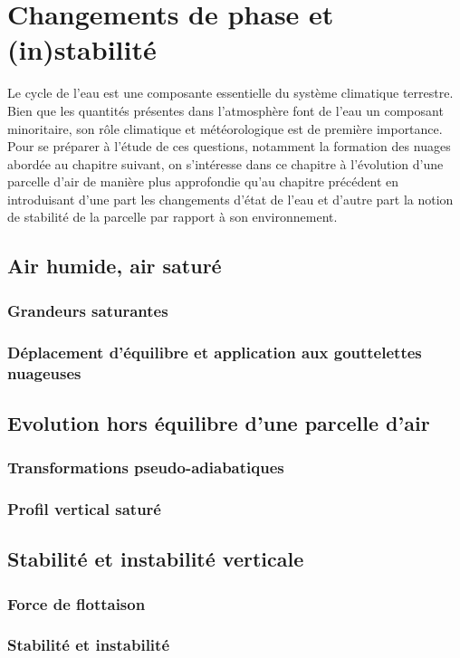 \chapter{Changements de phase et (in)stabilité}


\bk
Le cycle de l'eau est une composante essentielle du système climatique terrestre. Bien que les quantités présentes dans l'atmosphère font de l'eau un composant minoritaire, son rôle climatique et météorologique est de première importance. Pour se préparer à l'étude de ces questions, notamment la formation des nuages abordée au chapitre suivant, on s'intéresse dans ce chapitre à l'évolution d'une parcelle d'air de manière plus approfondie qu'au chapitre précédent en introduisant d'une part les changements d'état de l'eau et d'autre part la notion de stabilité de la parcelle par rapport à son environnement.

\mk
\section{Air humide, air saturé}
		

\sk
\subsection{Grandeurs saturantes}
	

\sk
\subsection{Déplacement d'équilibre et application aux gouttelettes nuageuses}
	


\mk \section{Evolution hors équilibre d'une parcelle d'air}

	\sk \subsection{Transformations pseudo-adiabatiques}
	

	\sk \subsection{Profil vertical saturé}
	

\mk \section{Stabilité et instabilité verticale}

	\sk \subsection{Force de flottaison}
	

	\sk \subsection{Stabilité et instabilité}
	
	



